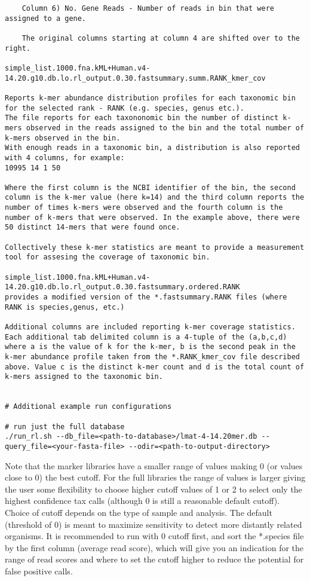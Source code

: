 \documentclass[11pt]{article}
\begin{document}
\begin{verbatim}
    Column 6) No. Gene Reads - Number of reads in bin that were assigned to a gene.

    The original columns starting at column 4 are shifted over to the right.

simple_list.1000.fna.kML+Human.v4-14.20.g10.db.lo.rl_output.0.30.fastsummary.summ.RANK_kmer_cov

Reports k-mer abundance distribution profiles for each taxonomic bin for the selected rank - RANK (e.g. species, genus etc.).
The file reports for each taxononomic bin the number of distinct k-mers observed in the reads assigned to the bin and the total number of k-mers observed in the bin.  
With enough reads in a taxonomic bin, a distribution is also reported with 4 columns, for example:
10995 14 1 50

Where the first column is the NCBI identifier of the bin, the second column is the k-mer value (here k=14) and the third column reports the number of times k-mers were observed and the fourth column is the number of k-mers that were observed. In the example above, there were 50 distinct 14-mers that were found once.

Collectively these k-mer statistics are meant to provide a measurement tool for assesing the coverage of taxonomic bin. 

simple_list.1000.fna.kML+Human.v4-14.20.g10.db.lo.rl_output.0.30.fastsummary.ordered.RANK
provides a modified version of the *.fastsummary.RANK files (where RANK is species,genus, etc.)

Additional columns are included reporting k-mer coverage statistics.  Each additional tab delimited column is a 4-tuple of the (a,b,c,d) where a is the value of k for the k-mer, b is the second peak in the k-mer abundance profile taken from the *.RANK_kmer_cov file described above. Value c is the distinct k-mer count and d is the total count of k-mers assigned to the taxonomic bin.


# Additional example run configurations

# run just the full database
./run_rl.sh --db_file=<path-to-database>/lmat-4-14.20mer.db --query_file=<your-fasta-file> --odir=<path-to-output-directory>
\end{verbatim}

Note that the marker libraries have a smaller range of values making 0 (or values close to 0) the best cutoff.  For the full libraries the range of values is larger giving the user some flexibility to choose higher cutoff values of 1 or 2 to select only the highest confidence tax calls (although 0 is still a reasonable default cutoff).  Choice of cutoff depends on the type of sample and analysis. The default (threshold of 0) is meant to maximize sensitivity to detect more distantly related organisms.  It is recommended to run with 0 cutoff first, and sort the *.species file by the first column (average read score), which will give you an indication for the range of read scores and where to set the cutoff higher to reduce the potential for false positive calls.
\end{document}
